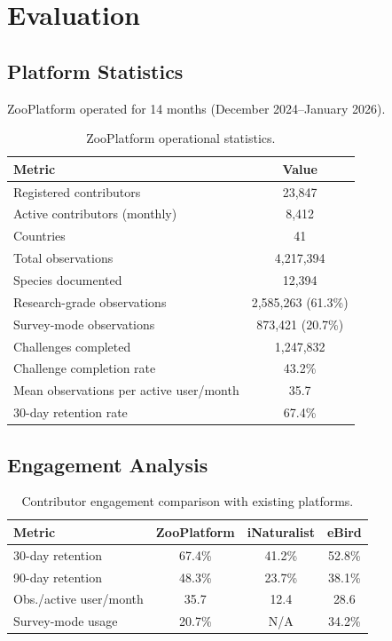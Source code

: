 \documentclass[11pt,a4paper]{article}
\begin{document}
\section{Evaluation}
\label{sec:evaluation}

\subsection{Platform Statistics}

ZooPlatform operated for 14 months (December 2024--January 2026).

\begin{table}[H]
\centering
\caption{ZooPlatform operational statistics.}
\label{tab:stats}
\begin{tabular}{lc}
\toprule
\textbf{Metric} & \textbf{Value} \\
\midrule
Registered contributors & 23{,}847 \\
Active contributors (monthly) & 8{,}412 \\
Countries & 41 \\
Total observations & 4{,}217{,}394 \\
Species documented & 12{,}394 \\
Research-grade observations & 2{,}585{,}263 (61.3\%) \\
Survey-mode observations & 873{,}421 (20.7\%) \\
Challenges completed & 1{,}247{,}832 \\
Challenge completion rate & 43.2\% \\
Mean observations per active user/month & 35.7 \\
30-day retention rate & 67.4\% \\
\bottomrule
\end{tabular}
\end{table}

\subsection{Engagement Analysis}

\begin{table}[H]
\centering
\caption{Contributor engagement comparison with existing platforms.}
\label{tab:engagement}
\begin{tabular}{lccc}
\toprule
\textbf{Metric} & \textbf{ZooPlatform} & \textbf{iNaturalist} &
  \textbf{eBird} \\
\midrule
30-day retention & 67.4\% & 41.2\% & 52.8\% \\
90-day retention & 48.3\% & 23.7\% & 38.1\% \\
Obs./active user/month & 35.7 & 12.4 & 28.6 \\
Survey-mode usage & 20.7\% & N/A & 34.2\% \\
\bottomrule
\end{tabular}
\end{table}
\end{document}
